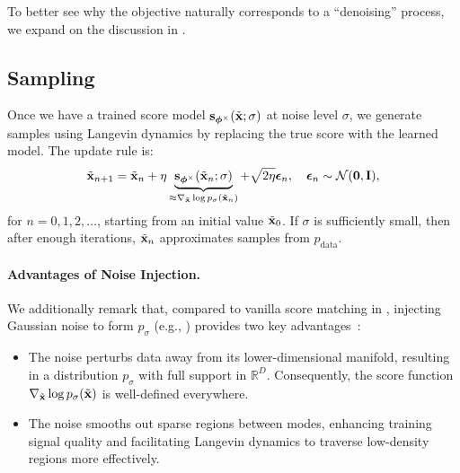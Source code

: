 To better see why the objective naturally corresponds to a ``denoising'' process,
we expand on the discussion in .





\subsection{Sampling} Once we have a trained score model ${\mathbf{s}}_{\bm{\phi}^\times}(\tilde{{\mathbf{x}}}; \sigma)$ at noise level $\sigma$, we generate samples using Langevin dynamics by replacing the true score with the learned model. The update rule is:
\begin{align}\label{eq:score-langevin-emp-dsm}
   \tilde{{\mathbf{x}}}_{n+1} = \tilde{{\mathbf{x}}}_n + \eta \underbrace{{\mathbf{s}}_{\bm{\phi}^\times}(\tilde{{\mathbf{x}}}_n; \sigma)}_{\approx \nabla_{\tilde{{\mathbf{x}}}} \log p_\sigma(\tilde{{\mathbf{x}}}_n)} + \sqrt{2\eta}    \bm{\epsilon}_n, \quad \bm{\epsilon}_n \sim \mathcal{N}(\mathbf{0}, {\mathbf{I}}),
\end{align}
for $n = 0, 1, 2, \dots$, starting from an initial value $\tilde{{\mathbf{x}}}_0$. If $\sigma$ is sufficiently small, then after enough iterations, $\tilde{{\mathbf{x}}}_n$ approximates samples from $p_{\text{data}}$.


\paragraph{Advantages of Noise Injection.}
We additionally remark that, compared to vanilla score matching in , injecting Gaussian noise to form $p_\sigma$ (e.g., ) provides two key advantages~\citep{song2019generative}:
\begin{itemize}
  \item {} The noise perturbs data away from its lower-dimensional manifold, resulting in a distribution $p_\sigma$ with full support in $\mathbb{R}^D$. Consequently, the score function $\nabla_{\tilde{{\mathbf{x}}}} \log p_\sigma(\tilde{{\mathbf{x}}})$ is well-defined everywhere.
  \item {} The noise smooths out sparse regions between modes, enhancing training signal quality and facilitating Langevin dynamics to traverse low-density regions more effectively.
\end{itemize}


